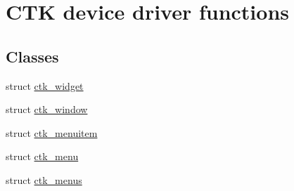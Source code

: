\hypertarget{group__ctkdraw}{}\section{C\+T\+K device driver functions}
\label{group__ctkdraw}
\subsection*{Classes}
\begin{DoxyCompactItemize}
\item 
struct \hyperlink{structctk__widget}{ctk\+\_\+widget}
\item 
struct \hyperlink{structctk__window}{ctk\+\_\+window}
\item 
struct \hyperlink{structctk__menuitem}{ctk\+\_\+menuitem}
\item 
struct \hyperlink{structctk__menu}{ctk\+\_\+menu}
\item 
struct \hyperlink{structctk__menus}{ctk\+\_\+menus}
\end{DoxyCompactItemize}

